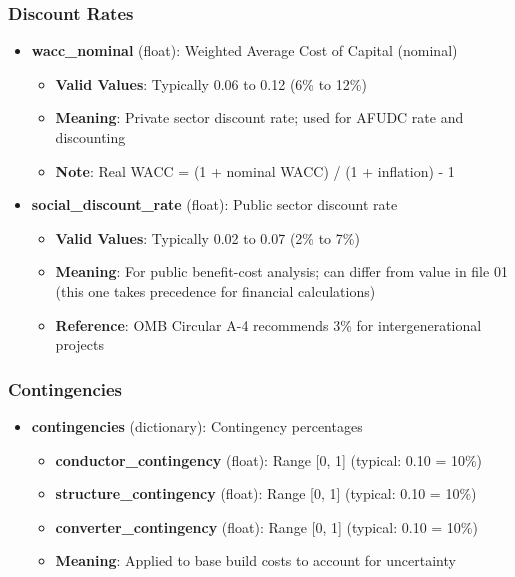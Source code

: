 \documentclass[ctcc_full_documentation.tex]{subfiles}
\begin{document}
\subsubsection{Discount Rates}

\begin{itemize}
    \item \textbf{wacc\_nominal} (float): Weighted Average Cost of Capital (nominal)
    \begin{itemize}
        \item \textbf{Valid Values}: Typically 0.06 to 0.12 (6\% to 12\%)
        \item \textbf{Meaning}: Private sector discount rate; used for AFUDC rate and discounting
        \item \textbf{Note}: Real WACC = (1 + nominal WACC) / (1 + inflation) - 1
    \end{itemize}
    
    \item \textbf{social\_discount\_rate} (float): Public sector discount rate
    \begin{itemize}
        \item \textbf{Valid Values}: Typically 0.02 to 0.07 (2\% to 7\%)
        \item \textbf{Meaning}: For public benefit-cost analysis; can differ from value in file 01 (this one takes precedence for financial calculations)
        \item \textbf{Reference}: OMB Circular A-4 recommends 3\% for intergenerational projects
    \end{itemize}
\end{itemize}

\subsubsection{Contingencies}

\begin{itemize}
    \item \textbf{contingencies} (dictionary): Contingency percentages
    \begin{itemize}
        \item \textbf{conductor\_contingency} (float): Range [0, 1] (typical: 0.10 = 10\%)
        \item \textbf{structure\_contingency} (float): Range [0, 1] (typical: 0.10 = 10\%)
        \item \textbf{converter\_contingency} (float): Range [0, 1] (typical: 0.10 = 10\%)
        \item \textbf{Meaning}: Applied to base build costs to account for uncertainty
    \end{itemize}
\end{itemize}
\end{document}
